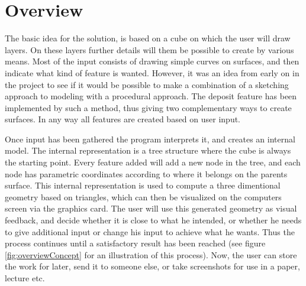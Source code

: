 \documentclass[a4paper,12pt]{report}
\begin{document}
\section{Overview}
The basic idea for the solution, is based on a cube on which the user will draw layers. On these layers further details will them be possible to create by various means. Most of the input consists of drawing simple curves on surfaces, and then indicate what kind of feature is wanted. However, it was an idea from early on in the project to see if it would be possible to make a combination of a sketching approach to modeling with a procedural approach. The deposit feature has been implemented by such a method, thus giving two complementary ways to create surfaces. In any way all features are created based on user input.

Once input has been gathered the program interprets it, and creates an internal model. The internal representation is a tree structure where the cube is always the starting point. Every feature added will add a new node in the tree, and each node has parametric coordinates according to where it belongs on the parents surface. This internal representation is used to compute a three dimentional geometry based on triangles, which can then be visualized on the computers screen via the graphics card. The user will use this generated geometry as visual feedback, and decide whether it is close to what he intended, or whether he needs to give additional input or change his input to achieve what he wants. Thus the process continues until a satisfactory result has been reached (see figure \ref{fig:overviewConcept} for an illustration of this process). Now, the user can store the work for later, send it to someone else, or take screenshots for use in a paper, lecture etc.
\end{document}
